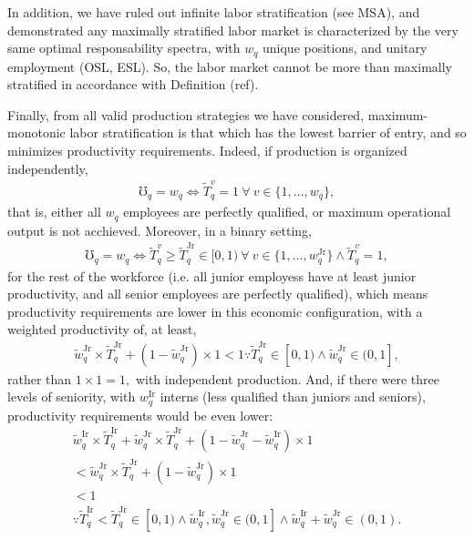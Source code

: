 \documentclass[hidelinks, nonatbib]{elsarticle}
\begin{document}
In addition, we have ruled out infinite labor stratification (see MSA), and demonstrated any maximally stratified labor market is characterized by the very same optimal responsability spectra, with $w_q$ unique positions, and unitary employment (OSL, ESL). So, the labor market cannot be more than maximally stratified in accordance with Definition (ref). 

Finally, from all valid production strategies we have considered, maximum-monotonic labor stratification is that which has the lowest barrier of entry, and so minimizes productivity requirements. Indeed, if production is organized independently,
\begin{gather}
\mho_q = w_q
\iff
\tilde{T}_{q}^{v}
=
1
\
\forall
\
v \in \{1, \dots, w_q\}
,
\end{gather}
that is, either all $w_q$ employees are perfectly qualified, or maximum operational output is not acchieved. Moreover, in a binary setting,
\begin{gather}
\mho_q = w_q
\iff
\tilde{T}_{q}^{v}
\geq
\tilde{T}_{q}^{\text{Jr}}
\in
[0,1)
\
\forall
\
v \in \{1, \dots, w_{q}^{\text{Jr}}\}
\land
\tilde{T}_{q}^{v}
=
1
,
\end{gather}
for the rest of the workforce (i.e. all junior employess have at least junior productivity, and all senior employees are perfectly qualified), which means productivity requirements are lower in this economic configuration, with a weighted productivity of, at least,
\begin{gather}
\tilde{w}_{q}^{\text{Jr}}
\times
\tilde{T}_{q}^{\text{Jr}}
+
(
    1 - \tilde{w}_{q}^{\text{Jr}}
)
\times
1
<
1
\because
\tilde{T}_{q}^{\text{Jr}}
\in
[0,1)
\land
\tilde{w}_{q}^{\text{Jr}}
\in
(0,1]
,
\end{gather}
rather than $1 \times 1 = 1,$ with independent production. And, if there were three levels of seniority, with $w_{q}^{\text{Ir}}$ interns (less qualified than juniors and seniors), productivity requirements would be even lower:
\begin{align}
\tilde{w}_{q}^{\text{Ir}}
\times
\tilde{T}_{q}^{\text{Ir}}
+
\tilde{w}_{q}^{\text{Jr}}
\times
\tilde{T}_{q}^{\text{Jr}}
+
(
    1 - \tilde{w}_{q}^{\text{Jr}} - \tilde{w}_{q}^{\text{Ir}}
)
\times
1
\\
<
\tilde{w}_{q}^{\text{Jr}}
\times
\tilde{T}_{q}^{\text{Jr}}
+
(
    1 - \tilde{w}_{q}^{\text{Jr}}
)
\times
1
\\
<
1
\\
\because
\tilde{T}_{q}^{\text{Ir}}
<
\tilde{T}_{q}^{\text{Jr}}
\in
[0,1)
\land
\tilde{w}_{q}^{\text{Ir}},
\tilde{w}_{q}^{\text{Jr}}
\in
(0,1]
\land
\tilde{w}_{q}^{\text{Ir}}
+
\tilde{w}_{q}^{\text{Jr}}
\in
(0,1)
.
\end{align}
\end{document}
